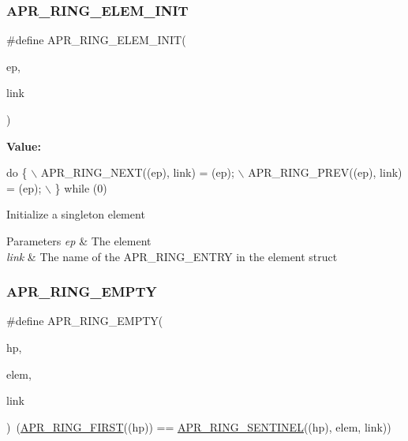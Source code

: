 \subsubsection{\texorpdfstring{A\+P\+R\+\_\+\+R\+I\+N\+G\+\_\+\+E\+L\+E\+M\+\_\+\+I\+N\+IT}{APR\_RING\_ELEM\_INIT}}
{\footnotesize\ttfamily \#define A\+P\+R\+\_\+\+R\+I\+N\+G\+\_\+\+E\+L\+E\+M\+\_\+\+I\+N\+IT(\begin{DoxyParamCaption}\item[{}]{ep,  }\item[{}]{link }\end{DoxyParamCaption})}

{\bfseries Value\+:}
\begin{DoxyCode}
\textcolor{keywordflow}{do} \{                \(\backslash\)
    APR\_RING\_NEXT((ep), link) = (ep);               \(\backslash\)
    APR\_RING\_PREV((ep), link) = (ep);               \(\backslash\)
    \} \textcolor{keywordflow}{while} (0)
\end{DoxyCode}
Initialize a singleton element 
\begin{DoxyParams}{Parameters}
{\em ep} & The element \\
\hline
{\em link} & The name of the A\+P\+R\+\_\+\+R\+I\+N\+G\+\_\+\+E\+N\+T\+RY in the element struct \\
\hline
\end{DoxyParams}
\mbox{\label{group__apr__ring_ga9b64ad6eebea19f896d2aa90172b6b9a}} 
\subsubsection{\texorpdfstring{A\+P\+R\+\_\+\+R\+I\+N\+G\+\_\+\+E\+M\+P\+TY}{APR\_RING\_EMPTY}}
{\footnotesize\ttfamily \#define A\+P\+R\+\_\+\+R\+I\+N\+G\+\_\+\+E\+M\+P\+TY(\begin{DoxyParamCaption}\item[{}]{hp,  }\item[{}]{elem,  }\item[{}]{link }\end{DoxyParamCaption})~(\mbox{\hyperlink{group__apr__ring_gacacd9cfca24feb7ff754d4008422efcb}{A\+P\+R\+\_\+\+R\+I\+N\+G\+\_\+\+F\+I\+R\+ST}}((hp)) == \mbox{\hyperlink{group__apr__ring_ga54210090292ebafcd0a0d75d9ff1563d}{A\+P\+R\+\_\+\+R\+I\+N\+G\+\_\+\+S\+E\+N\+T\+I\+N\+EL}}((hp), elem, link))}


